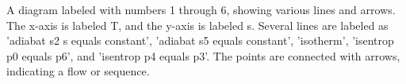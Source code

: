 A diagram labeled with numbers 1 through 6, showing various lines and arrows. The x-axis is labeled T, and the y-axis is labeled s. Several lines are labeled as 'adiabat s2 s equals constant', 'adiabat s5 equals constant', 'isotherm', 'isentrop p0 equals p6', and 'isentrop p4 equals p3'. The points are connected with arrows, indicating a flow or sequence.